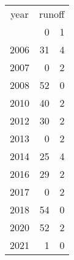 \footnotesize\begin{tabular}[t]{lrr}
\toprule
\multicolumn{1}{c}{year} & \multicolumn{2}{c}{runoff} \\
\cmidrule(l{3pt}r{3pt}){1-1} \cmidrule(l{3pt}r{3pt}){2-3}
  & 0 & 1\\
\midrule
2006 & 31 & 4\\
2007 & 0 & 2\\
2008 & 52 & 0\\
2010 & 40 & 2\\
2012 & 30 & 2\\
2013 & 0 & 2\\
2014 & 25 & 4\\
2016 & 29 & 2\\
2017 & 0 & 2\\
2018 & 54 & 0\\
2020 & 52 & 2\\
2021 & 1 & 0\\
\bottomrule
\end{tabular}

